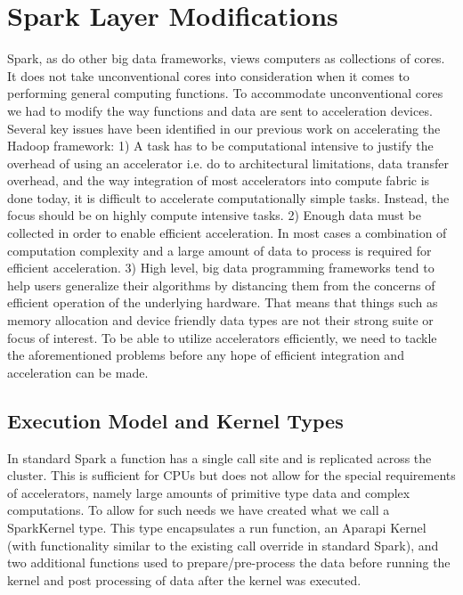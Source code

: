 \documentclass[runningheads,a4paper]{llncs}
\begin{document}
\section{Spark Layer Modifications}
Spark, as do other big data frameworks, views computers as collections of cores. It does not take unconventional cores into consideration when it comes to performing general computing functions. To accommodate unconventional
cores we had to modify the way functions and data are sent to acceleration devices. Several key issues have been identified in our previous work  \cite{Segal:2014, SegalMCW14} on accelerating the Hadoop framework:
1) A task has to be computational intensive to justify the overhead of using an accelerator i.e. do to architectural limitations, data transfer overhead, and the way integration of most accelerators into compute fabric is done today, it is difficult to accelerate computationally simple tasks. Instead, the focus should be on highly compute intensive tasks.
2) Enough data must be collected in order to enable efficient acceleration. In most cases a combination of computation complexity and a large amount of data to process is required for efficient acceleration.
3) High level, big data programming frameworks tend to help users generalize their algorithms by distancing them from the concerns of efficient operation of the underlying hardware. That means that things such as memory allocation and device friendly data types are not their strong suite or focus of interest.
To be able to utilize accelerators efficiently, we need to tackle the aforementioned problems before any hope of efficient integration and acceleration can be made.


\subsection{Execution Model and Kernel Types}
In standard Spark a function has a single call site and is replicated across the cluster. This is sufficient for CPUs but does not allow for the special requirements of accelerators, namely large amounts of primitive type data and complex computations. To allow for such needs we have created what we call a SparkKernel type. This type encapsulates a run function, an Aparapi Kernel (with functionality similar to the existing call override in standard Spark), and two additional functions used to prepare/pre-process the data before running the kernel and post processing of data after the kernel was executed.
\end{document}

